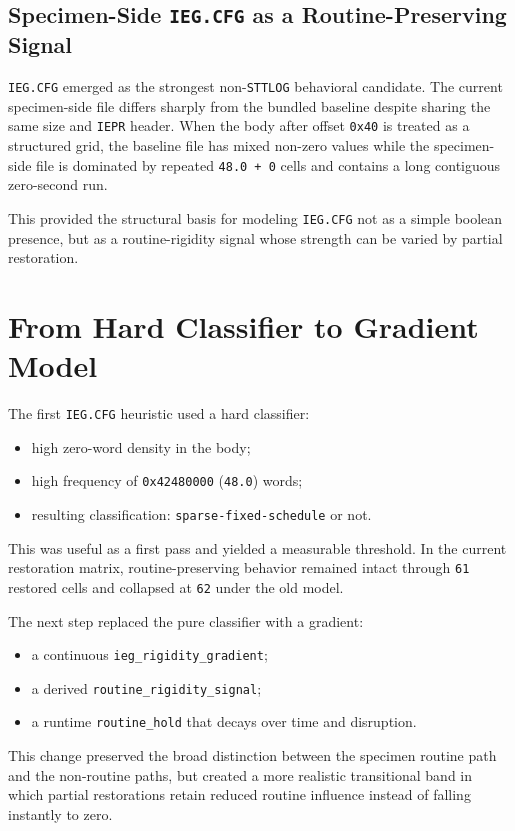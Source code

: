 \subsection{Specimen-Side \texttt{IEG.CFG} as a Routine-Preserving Signal}
\texttt{IEG.CFG} emerged as the strongest non-\texttt{STTLOG} behavioral
candidate. The current specimen-side file differs sharply from the bundled
baseline despite sharing the same size and \texttt{IEPR} header. When the body
after offset \texttt{0x40} is treated as a structured grid, the baseline file
has mixed non-zero values while the specimen-side file is dominated by
repeated \texttt{48.0 + 0} cells and contains a long contiguous zero-second run.

This provided the structural basis for modeling \texttt{IEG.CFG} not as a
simple boolean presence, but as a routine-rigidity signal whose strength can be
varied by partial restoration.

\section{From Hard Classifier to Gradient Model}
The first \texttt{IEG.CFG} heuristic used a hard classifier:
\begin{itemize}[leftmargin=*]
\item high zero-word density in the body;
\item high frequency of \texttt{0x42480000} (\texttt{48.0}) words;
\item resulting classification: \texttt{sparse-fixed-schedule} or not.
\end{itemize}

This was useful as a first pass and yielded a measurable threshold. In the
current restoration matrix, routine-preserving behavior remained intact through
\texttt{61} restored cells and collapsed at \texttt{62} under the old model.

The next step replaced the pure classifier with a gradient:
\begin{itemize}[leftmargin=*]
\item a continuous \texttt{ieg\_rigidity\_gradient};
\item a derived \texttt{routine\_rigidity\_signal};
\item a runtime \texttt{routine\_hold} that decays over time and disruption.
\end{itemize}

This change preserved the broad distinction between the specimen routine path
and the non-routine paths, but created a more realistic transitional band in
which partial restorations retain reduced routine influence instead of falling
instantly to zero.

